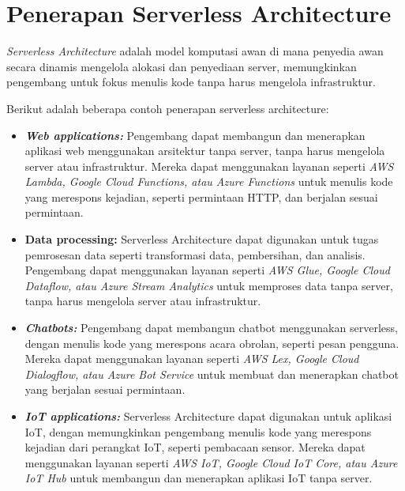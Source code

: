 \section{Penerapan Serverless Architecture}
	\emph{Serverless Architecture} adalah model komputasi awan di mana penyedia awan secara dinamis mengelola alokasi dan penyediaan server, memungkinkan pengembang untuk fokus menulis kode tanpa harus mengelola infrastruktur.
	
	Berikut adalah beberapa contoh penerapan serverless architecture:
	\begin{itemize}
		\item \textbf{\textit{Web applications:}} Pengembang dapat membangun dan menerapkan aplikasi web menggunakan arsitektur tanpa server, tanpa harus mengelola server atau infrastruktur. Mereka dapat menggunakan layanan seperti \emph{AWS Lambda, Google Cloud Functions, atau Azure Functions} untuk menulis kode yang merespons kejadian, seperti permintaan HTTP, dan berjalan sesuai permintaan.
		\item \textbf{Data processing:} Serverless Architecture dapat digunakan untuk tugas pemrosesan data seperti transformasi data, pembersihan, dan analisis. Pengembang dapat menggunakan layanan seperti \emph{AWS Glue, Google Cloud Dataflow, atau Azure Stream Analytics} untuk memproses data tanpa server, tanpa harus mengelola server atau infrastruktur.
		\item \textbf{\textit{Chatbots:}} Pengembang dapat membangun chatbot menggunakan serverless, dengan menulis kode yang merespons acara obrolan, seperti pesan pengguna. Mereka dapat menggunakan layanan seperti \emph{AWS Lex, Google Cloud Dialogflow, atau Azure Bot Service} untuk membuat dan menerapkan chatbot yang berjalan sesuai permintaan.
		\item \textbf{\textit{IoT applications:}} Serverless Architecture dapat digunakan untuk aplikasi IoT, dengan memungkinkan pengembang menulis kode yang merespons kejadian dari perangkat IoT, seperti pembacaan sensor. Mereka dapat menggunakan layanan seperti \emph{AWS IoT, Google Cloud IoT Core, atau Azure IoT Hub} untuk membangun dan menerapkan aplikasi IoT tanpa server.
	\end{itemize}


